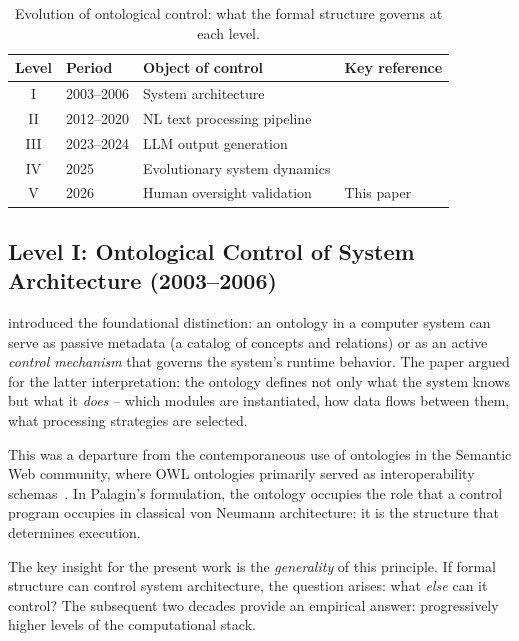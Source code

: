 \documentclass[11pt]{article}
\begin{document}
\begin{table}[h]
\centering
\caption{Evolution of ontological control: what the formal structure governs at each level.}
\label{tab:evolution}
\begin{tabular}{@{}clll@{}}
\toprule
\textbf{Level} & \textbf{Period} & \textbf{Object of control} & \textbf{Key reference} \\
\midrule
I   & 2003--2006 & System architecture        & \citet{palagin2006architecture} \\
II  & 2012--2020 & NL text processing pipeline & \citet{palagin2012knowledge,palagin2020distributional} \\
III & 2023--2024 & LLM output generation       & \citet{palagin2023ontochatgpt,palagin2024neural} \\
IV  & 2025       & Evolutionary system dynamics & \citet{palagin2025evolutionary} \\
V   & 2026       & Human oversight validation   & This paper \\
\bottomrule
\end{tabular}
\end{table}

\subsection{Level I: Ontological Control of System Architecture (2003--2006)}
\label{sec:level1}

\citet{palagin2006architecture} introduced the foundational distinction: an ontology in a computer system can serve as passive metadata (a catalog of concepts and relations) or as an active \emph{control mechanism} that governs the system's runtime behavior.
The paper argued for the latter interpretation: the ontology defines not only what the system knows but what it \emph{does} -- which modules are instantiated, how data flows between them, what processing strategies are selected.

This was a departure from the contemporaneous use of ontologies in the Semantic Web community, where OWL ontologies primarily served as interoperability schemas~\citep{grau2008owl2}.
In Palagin's formulation, the ontology occupies the role that a control program occupies in classical von Neumann architecture: it is the structure that determines execution.

The key insight for the present work is the \emph{generality} of this principle.
If formal structure can control system architecture, the question arises: what \emph{else} can it control?
The subsequent two decades provide an empirical answer: progressively higher levels of the computational stack.
\end{document}
